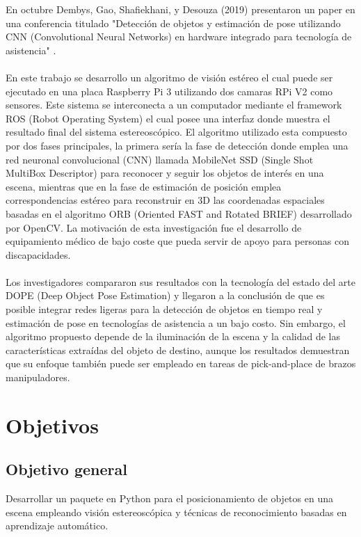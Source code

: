 \documentclass[letterpaper,titlepage,12pt,oneside,spanish,final]{report_eie}
\numberwithin{equation}{chapter}%
\numberwithin{figure}{chapter}%
\numberwithin{table}{chapter}%
\numberwithin{definition}{chapter}%
\numberwithin{lemma}{chapter}%
\numberwithin{theorem}{chapter}%
\numberwithin{corollary}{chapter}%
\numberwithin{condition}{chapter}%
\numberwithin{criterion}{chapter}%
\numberwithin{problem}{chapter}%
\numberwithin{property}{chapter}%
\numberwithin{proposition}{chapter}%
\numberwithin{solution}{chapter}%
\numberwithin{conjecture}{chapter}%
\begin{document}
En octubre Dembys, Gao, Shafiekhani, y Desouza (2019) presentaron un paper en una conferencia titulado "Detección de objetos y estimación de pose utilizando CNN (Convolutional Neural Networks) en hardware integrado para tecnología de asistencia" \cite{AssistiveTech}.
\\
\\
En este trabajo se desarrollo un algoritmo de visión estéreo el cual puede ser ejecutado en una placa Raspberry Pi 3 utilizando dos camaras RPi V2 como sensores. Este sistema se interconecta a un computador mediante el framework ROS (Robot Operating System) el cual posee una interfaz donde muestra el resultado final del sistema estereoscópico. El algoritmo utilizado esta compuesto por dos fases principales, la primera sería la fase de detección donde emplea una red neuronal convolucional (CNN) llamada MobileNet SSD (Single Shot MultiBox Descriptor) para reconocer y seguir los objetos de interés en una escena, mientras que en la fase de estimación de posición emplea correspondencias estéreo para reconstruir en 3D las coordenadas espaciales basadas en el algoritmo ORB (Oriented FAST and Rotated BRIEF) desarrollado por OpenCV. La motivación de esta investigación fue el desarrollo de equipamiento médico de bajo coste que pueda servir de apoyo para personas con discapacidades.
\\
\\
Los investigadores compararon sus resultados con la tecnología del estado del arte DOPE (Deep Object Pose Estimation) y llegaron a la conclusión de que es posible integrar redes ligeras para la detección de objetos en tiempo real y estimación de pose en tecnologías de asistencia a un bajo costo. Sin embargo, el algoritmo propuesto depende de la iluminación de la escena y la calidad de las características extraídas del objeto de destino, aunque los resultados demuestran que su enfoque también puede ser empleado en tareas de pick-and-place de brazos manipuladores.
\section*{Objetivos}
\subsection*{Objetivo general}
Desarrollar un paquete en Python para el posicionamiento de objetos en una escena empleando visión estereoscópica y técnicas de reconocimiento basadas en aprendizaje automático.
\end{document}
